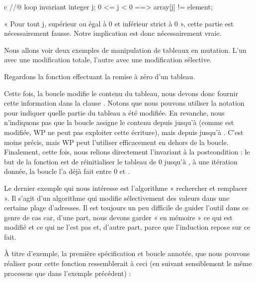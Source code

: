 \begin{CodeBlock}{c}
//@ loop invariant \forall integer j; 0 <= j < 0 ==> array[j] != element;
\end{CodeBlock}


« Pour tout j, supérieur ou égal à 0 et inférieur strict à 0 », cette partie est
nécessairement fausse. Notre implication est donc nécessairement vraie.




Nous allons voir deux exemples de manipulation de tableaux en mutation.
L'un avec une modification totale, l'autre avec une modification sélective.





Regardons la fonction effectuant la remise à zéro d'un tableau.





Cette fois, la boucle modifie le contenu du tableau, nous devons donc fournir
cette information dans la clause . Notons que nous
pouvons utiliser la notation  pour indiquer quelle partie du
tableau a été modifiée. En revanche, nous n'indiquons pas que la boucle assigne le
contenu depuis  jusqu'à  (comme 
est modifiée, WP ne peut pas exploiter cette écriture), mais depuis 
jusqu'à . C'est moins précis, mais WP peut l'utiliser
efficacement en dehors de la boucle. Finalement, cette fois, nous relions
directement l'invariant à la postcondition : le but de la fonction est de
réinitialiser le tableau de 0 jusqu'à , à une itération
donnée, la boucle l'a déjà fait entre 0 et .


\label{l4:statements-loops-ex-search-and-replace}


Le dernier exemple qui nous intéresse est l'algorithme « rechercher et remplacer ».
Il s'agit d'un algorithme qui modifie sélectivement des valeurs dans une
certaine plage d'adresses. Il est toujours un peu difficile de guider l'outil
dans ce genre de cas car, d'une part, nous devons garder « en mémoire » ce qui est modifié
et ce qui ne l'est pas et, d'autre part, parce que l'induction repose sur ce fait.


À titre d'exemple, la première spécification et boucle annotée, que nous pouvons
réaliser pour cette fonction ressemblerait à ceci (en suivant sensiblement le
même processus que dans l'exemple précédent) :


